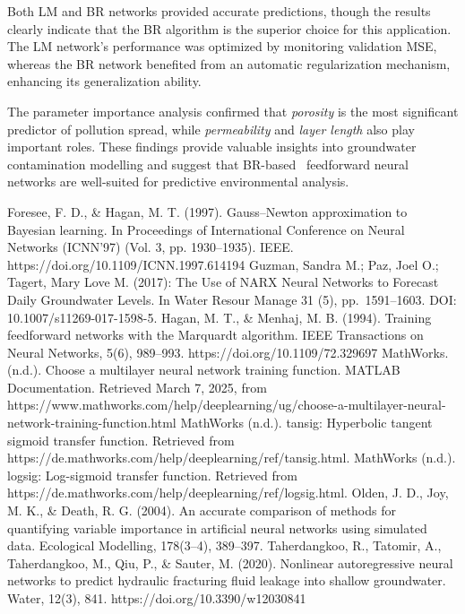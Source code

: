 \documentclass[10pt]{article}
\begin{document}
	Both LM and BR networks provided accurate predictions, though the results clearly indicate that the BR algorithm is the superior choice for this application. The LM network’s performance was optimized by monitoring validation MSE, whereas the BR network benefited from an automatic regularization mechanism, enhancing its generalization ability.
	
	The parameter importance analysis confirmed that \textit{porosity} is the most significant predictor of pollution spread, while \textit{permeability} and \textit{layer length} also play important roles. These findings provide valuable insights into groundwater contamination modelling and suggest that BR-based  feedforward neural networks are well-suited for predictive environmental analysis.
	
	
	
	
	
	\begin{thebibliography}{99} %
		Foresee, F. D., \& Hagan, M. T. (1997). Gauss–Newton approximation to Bayesian learning. In Proceedings of International Conference on Neural Networks (ICNN’97) (Vol. 3, pp. 1930–1935). IEEE. https://doi.org/10.1109/ICNN.1997.614194
		Guzman, Sandra M.; Paz, Joel O.; Tagert, Mary Love M. (2017): The Use of NARX Neural Networks to Forecast Daily Groundwater Levels. In Water Resour Manage 31 (5), pp. 1591–1603. DOI: 10.1007/s11269-017-1598-5.
		Hagan, M. T., \& Menhaj, M. B. (1994). Training feedforward networks with the Marquardt algorithm. IEEE Transactions on Neural Networks, 5(6), 989–993. https://doi.org/10.1109/72.329697
		MathWorks. (n.d.). Choose a multilayer neural network training function. MATLAB Documentation. Retrieved March 7, 2025, from https://www.mathworks.com/help/deeplearning/ug/choose-a-multilayer-neural-network-training-function.html
		MathWorks (n.d.). tansig: Hyperbolic tangent sigmoid transfer function. Retrieved from https://de.mathworks.com/help/deeplearning/ref/tansig.html.
		MathWorks (n.d.). logsig: Log-sigmoid transfer function. Retrieved from https://de.mathworks.com/help/deeplearning/ref/logsig.html.
		Olden, J. D., Joy, M. K., \& Death, R. G. (2004). An accurate comparison of methods for quantifying variable importance in artificial neural networks using simulated data. Ecological Modelling, 178(3–4), 389–397.
		Taherdangkoo, R., Tatomir, A., Taherdangkoo, M., Qiu, P., \& Sauter, M. (2020). Nonlinear autoregressive neural networks to predict hydraulic fracturing fluid leakage into shallow groundwater. Water, 12(3), 841. https://doi.org/10.3390/w12030841
	\end{thebibliography}
	
\end{document}

